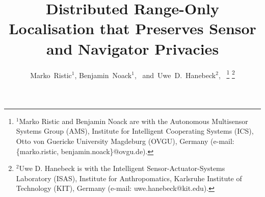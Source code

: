 \documentclass[10pt,letterpaper,oneside,twocolumn,journal]{IEEEtran}
\theoremstyle{definition}
\theoremstyle{definition}
\theoremstyle{remark}
\begin{document}
\title{Distributed Range-Only Localisation that Preserves Sensor and Navigator Privacies}

\author{Marko~Ristic$^{1}$,
        Benjamin~Noack$^{1}$,~
        and~Uwe~D.~Hanebeck$^{2}$,~%
\thanks{$^{1}$Marko Ristic and Benjamin Noack are with the Autonomous Multisensor Systems Group (AMS), Institute for Intelligent Cooperating Systems (ICS), Otto von Guericke University Magdeburg (OVGU), Germany (e-mail: \{marko.ristic, benjamin.noack\}@ovgu.de).}%
\thanks{$^{2}$Uwe D. Hanebeck is with the Intelligent Sensor-Actuator-Systems Laboratory (ISAS), Institute for Anthropomatics, Karlsruhe Institute of Technology (KIT), Germany (e-mail: uwe.hanebeck@kit.edu).}}%

\maketitle

% 
%                                                                                             
%                                                                                             
%                                                                                             
% 
\end{document}
